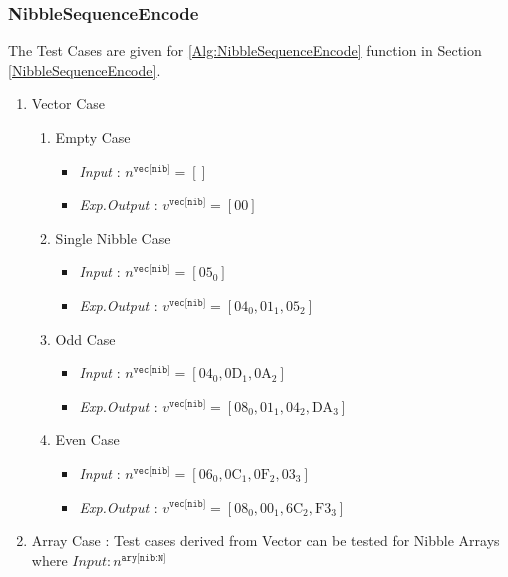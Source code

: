 \documentclass[../alan-handbook.tex]{subfiles}
\begin{document}
\subsubsection{NibbleSequenceEncode} \label{Test:NibbleSequenceEncode}

The Test Cases are given for  \ref{Alg:NibbleSequenceEncode} function in Section \ref{NibbleSequenceEncode}.

\begin{enumerate}
    \item Vector Case
    \begin{enumerate}
        \item Empty Case 
            \begin{itemize}
                \item \textit{Input} : $n^{\texttt{vec[nib]}} = []$
                \item \textit{Exp.Output} : $v^{\texttt{vec[nib]}} = [\text{00}]$
            \end{itemize}
        \item Single Nibble Case 
            \begin{itemize}
                \item \textit{Input} : $n^{\texttt{vec[nib]}} = [\text{05}_0]$
                \item \textit{Exp.Output} : $v^{\texttt{vec[nib]}} = [\text{04}_0,\text{01}_1,\text{05}_2]$
            \end{itemize}
        \item Odd Case 
            \begin{itemize}
                \item \textit{Input} : $n^{\texttt{vec[nib]}} = [\text{04}_0,\text{0D}_1,\text{0A}_2]$
                \item \textit{Exp.Output} : $v^{\texttt{vec[nib]}} = [\text{08}_0,\text{01}_1,\text{04}_2,\text{DA}_3]$
            \end{itemize}
        \item Even Case
            \begin{itemize}
                \item \textit{Input} : $n^{\texttt{vec[nib]}} = [\text{06}_0,\text{0C}_1,\text{0F}_2,\text{03}_3]$
                \item \textit{Exp.Output} : $v^{\texttt{vec[nib]}} = [\text{08}_0,\text{00}_1,\text{6C}_2,\text{F3}_3]$
            \end{itemize}
    \end{enumerate}
    \item Array Case : Test cases derived from Vector can be tested for Nibble Arrays where $\textit{Input} : n^{\texttt{ary[nib:N]}}$
\end{enumerate}
\end{document}
